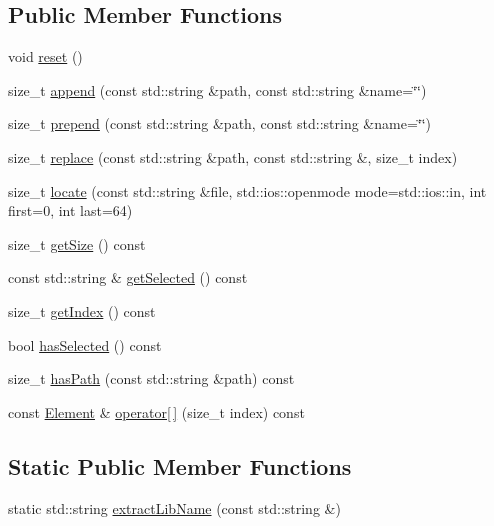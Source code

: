 \subsection*{Public Member Functions}
\begin{DoxyCompactItemize}
\item 
void \mbox{\hyperlink{classCRL_1_1SearchPath_a7081332b63c642917b4ca15f665662f4}{reset}} ()
\item 
size\+\_\+t \mbox{\hyperlink{classCRL_1_1SearchPath_af358bdb1e940f08137f887f70eb641e3}{append}} (const std\+::string \&path, const std\+::string \&name=\char`\"{}\char`\"{})
\item 
size\+\_\+t \mbox{\hyperlink{classCRL_1_1SearchPath_af39d78a63d880e90ae6f947abf1fe322}{prepend}} (const std\+::string \&path, const std\+::string \&name=\char`\"{}\char`\"{})
\item 
size\+\_\+t \mbox{\hyperlink{classCRL_1_1SearchPath_a6cd1524e1048f246682cd5ef40145d67}{replace}} (const std\+::string \&path, const std\+::string \&, size\+\_\+t index)
\item 
size\+\_\+t \mbox{\hyperlink{classCRL_1_1SearchPath_af8e579af7e78dddb7a014d4bbbf9a36f}{locate}} (const std\+::string \&file, std\+::ios\+::openmode mode=std\+::ios\+::in, int first=0, int last=64)
\item 
size\+\_\+t \mbox{\hyperlink{classCRL_1_1SearchPath_a861b3045d7ee4671c93ba0396e3639f9}{get\+Size}} () const
\item 
const std\+::string \& \mbox{\hyperlink{classCRL_1_1SearchPath_a1571b1b80eca0da7333a014044158b6f}{get\+Selected}} () const
\item 
size\+\_\+t \mbox{\hyperlink{classCRL_1_1SearchPath_aa1023cd4721778d12756850a57f6a530}{get\+Index}} () const
\item 
bool \mbox{\hyperlink{classCRL_1_1SearchPath_ac6a365281c272da46a02e68de2a401d1}{has\+Selected}} () const
\item 
size\+\_\+t \mbox{\hyperlink{classCRL_1_1SearchPath_a0e255b4339b5ec59bc8425bad057dc4f}{has\+Path}} (const std\+::string \&path) const
\item 
const \mbox{\hyperlink{classCRL_1_1SearchPath_1_1Element}{Element}} \& \mbox{\hyperlink{classCRL_1_1SearchPath_a2ba563c50865bc8417d65cf4a6b342d1}{operator\mbox{[}$\,$\mbox{]}}} (size\+\_\+t index) const
\end{DoxyCompactItemize}
\subsection*{Static Public Member Functions}
\begin{DoxyCompactItemize}
\item 
static std\+::string \mbox{\hyperlink{classCRL_1_1SearchPath_aef473ae1037c8cb792a3af02baea6fdc}{extract\+Lib\+Name}} (const std\+::string \&)
\end{DoxyCompactItemize}


